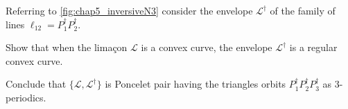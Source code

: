 \begin{exercise}\label{exer:53} Referring to \cref{fig:chap5_inversiveN3} consider the envelope $\mathcal{L}^\dag$ of the family of lines
$\ell_{12}=P_1^\dag P_2^\dag$.

Show that when the limaçon $\mathcal{L}$ is a convex curve, the envelope $\mathcal{L}^\dag$ is a regular convex curve.

Conclude that  $\{ \mathcal{L}, \mathcal{L}^\dag\}$ is Poncelet pair having  the triangles orbits $P_1^{\dag}P_2^{\dag}P_3^{\dag}$ as 3-periodics.
 
 
\end{exercise}